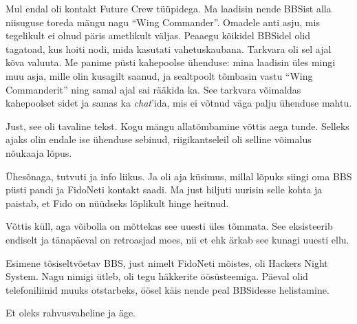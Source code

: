 Mul endal oli kontakt Future Crew tüüpidega. Ma laadisin nende BBSist alla niisuguse 
toreda mängu nagu \enquote{Wing Commander}. 
Omadele anti asju, mis tegelikult ei olnud
päris ametlikult väljas. Peaaegu kõikidel BBSidel olid tagatoad, 
kus hoiti nodi, mida kasutati vahetuskaubana. Tarkvara oli sel 
ajal kõva valuuta. Me panime püsti kahepoolse ühenduse: mina 
laadisin üles mingi muu asja, mille olin kusagilt saanud, ja 
sealtpoolt tõmbasin vastu \enquote{Wing Commanderit} ning samal ajal sai rääkida ka. 
See tarkvara võimaldas kahepoolset sidet ja samas ka 
\emph{chat}'ida, mis ei võtnud väga palju ühenduse mahtu.


Just, see oli tavaline tekst. Kogu mängu allatõmbamine võttis 
aega tunde. Selleks ajaks olin endale ise ühenduse sebinud, riigikantseleil oli
selline võimalus nõukaaja lõpus. 

Ühesõnaga, tutvuti ja info liikus. Ja oli aja küsimus, millal lõpuks siingi 
oma BBS püsti pandi ja FidoNeti kontakt saadi. Ma just hiljuti uurisin selle 
kohta ja paistab, et Fido on nüüdseks lõplikult hinge heitnud.


Võttis küll, aga võibolla on mõttekas see uuesti üles tõmmata. See eksisteerib endiselt ja 
tänapäeval on retroasjad moes, nii et ehk ärkab see kunagi uuesti ellu.


Esimene tõsiseltvõetav BBS, just nimelt FidoNeti mõistes, oli Hackers Night 
System. Nagu 
nimigi ütleb, oli tegu häkkerite öösüsteemiga. Päeval olid telefoniliinid muuks 
otstarbeks, öösel käis nende peal BBSidesse helistamine. 


Et oleks rahvusvaheline ja äge.

